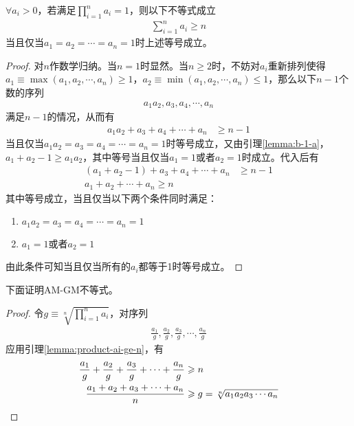 \begin{lemma}\label{lemma:product-ai-ge-n}
  $\forall a_i>0$，若满足$\prod_{i=1}^n a_i=1$，则以下不等式成立
  \begin{align}
    \sum_{i=1}^n a_i\ge n
  \end{align}
  当且仅当$a_1=a_2=\cdots=a_n=1$时上述等号成立。
\end{lemma}
\begin{proof}
  对$n$作数学归纳。当$n=1$时显然。当$n\ge2$时，不妨对$a_i$重新排列使得$a_1\equiv\max(a_1,a_2,\cdots,a_n)\ge1$，$a_2\equiv\min(a_1,a_2,\cdots,a_n)\le1$，那么以下$n-1$个数的序列
  \begin{align*}
    a_1a_2, a_3, a_4, \cdots, a_n
  \end{align*}
  满足$n-1$的情况，从而有
  \begin{align*}
    a_1a_2 + a_3+ a_4+ \cdots + a_n &\ge n-1
  \end{align*}
  当且仅当$a_1a_2=a_3=a_4=\cdots=a_n=1$时等号成立，又由引理\ref{lemma:b-1-a}，$a_1+a_2 - 1\ge a_1a_2$，其中等号当且仅当$a_1=1$或者$a_2=1$时成立。代入后有
  \begin{align*}
    (a_1 + a_2 - 1) + a_3+ a_4+ \cdots + a_n &\ge n-1\\
    a_1 + a_2 + \cdots + a_n\ge n
  \end{align*}
  其中等号成立，当且仅当以下两个条件同时满足：
  \begin{enumerate}
  \item $a_1a_2=a_3=a_4=\cdots=a_n=1$
  \item $a_1=1$或者$a_2=1$
  \end{enumerate}
  由此条件可知当且仅当所有的$a_i$都等于1时等号成立。
\end{proof}

下面证明AM-GM不等式。
\begin{proof}
  令$g\equiv\sqrt[n]{\prod\limits_{i=1}^n a_i}$，对序列
  \begin{align*}
    \frac{a_1}{g}, \frac{a_2}{g}, \frac{a_3}{g}, \cdots, \frac{a_n}{g}
  \end{align*}
  应用引理\ref{lemma:product-ai-ge-n}，有
  \begin{align*}
    \frac{a_1}{g} + \frac{a_2}{g} + \frac{a_3}{g} + \cdots + \frac{a_n}{g}&\ge n\\
    \frac{a_1 + a_2 + a_3 + \cdots + a_n}{n}&\ge g = \sqrt[n]{a_1a_2a_3\cdots a_n} \qedhere
  \end{align*}
\end{proof}

